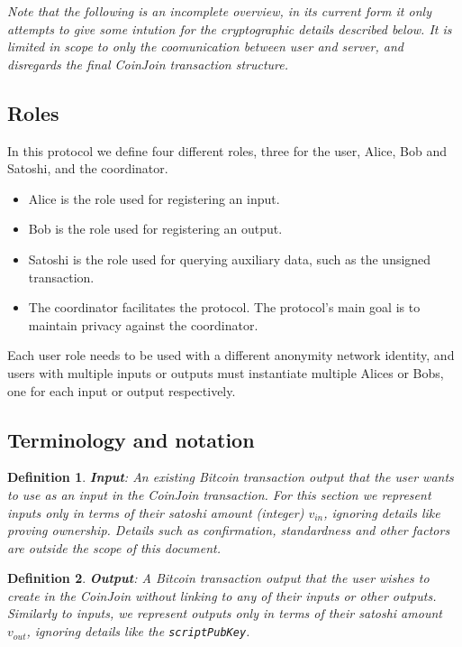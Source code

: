 \documentclass{article}
\newtheorem{definition}{Definition}[section]
\begin{document}
\textit{Note that the following is an incomplete overview, in its current form it only attempts to give some intution for the cryptographic details described below. It is limited in scope to only the coomunication between user and server, and disregards the final CoinJoin transaction structure.}

\subsection{Roles}
In this protocol we define four different roles, three for the user, Alice, Bob and Satoshi, and the coordinator.

\begin{itemize}
    \item Alice is the role used for registering an input.
    \item Bob is the role used for registering an output.
    \item Satoshi is the role used for querying auxiliary data, such as the unsigned transaction.
    \item The coordinator facilitates the protocol. The protocol's main goal is to maintain privacy against the coordinator.
\end{itemize}

Each user role needs to be used with a different anonymity network identity, and users with multiple inputs or outputs must instantiate multiple Alices or Bobs, one for each input or output respectively.

\subsection{Terminology and notation}

\begin{definition} \textbf{Input}:
An existing Bitcoin transaction output that the user wants to use as an input in the CoinJoin transaction. For this section we represent inputs only in terms of their satoshi amount (integer) $v_{\mathit{in}}$, ignoring details like proving ownership. Details such as confirmation, standardness and other factors are outside the scope of this document.
\end{definition}

\begin{definition} \textbf{Output}:
A Bitcoin transaction output that the user wishes to create in the CoinJoin without linking to any of their inputs or other outputs. Similarly to inputs, we represent outputs only in terms of their satoshi amount $v_{\mathit{out}}$, ignoring details like the \texttt{scriptPubKey}.
\end{definition}
\end{document}
